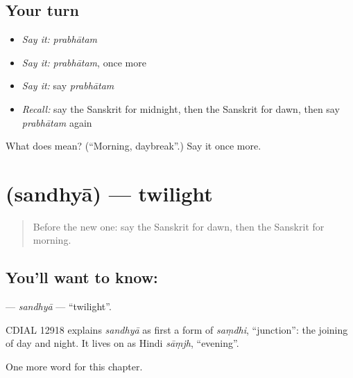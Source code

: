 \subsection*{Your turn}
\begin{itemize}
\raggedright
  \item \emph{Say it:} \emph{prabhātam}
  \item \emph{Say it:} \emph{prabhātam}, once more
  \item \emph{Say it:} say \emph{prabhātam}
  \item \emph{Recall:} say the Sanskrit for midnight, then the Sanskrit for dawn, then say \emph{prabhātam} again
\end{itemize}

\begin{tcolorbox}[breakable,colback=teal!4,colframe=teal!35!black,title={Before you move on}]
What does  mean? (\textquotedblleft{}Morning, daybreak\textquotedblright{}.) Say it once more.
\end{tcolorbox}
\section[\texorpdfstring{\sk{सन्ध्या} (sandhyā)}{सन्ध्या (sandhyā)}]{ (sandhyā) — twilight}

\label{lesson:SA-C91-sandhya}



\begin{quote}
Before the new one: say the Sanskrit for dawn, then the Sanskrit for morning.
\end{quote}

\subsection*{You'll want to know: }
\textbf{} — \emph{sandhyā} — \textquotedblleft{}twilight\textquotedblright{}.

\begin{cousinweb}
CDIAL 12918 explains \emph{sandhyā} as first a form of \emph{saṃdhi}, \textquotedblleft{}junction\textquotedblright{}: the joining of day and night. It lives on as Hindi \emph{sāṃjh}, \textquotedblleft{}evening\textquotedblright{}.
\end{cousinweb}

\begin{grammarlens}[title={What you've built}]
One more word for this chapter.
\end{grammarlens}

